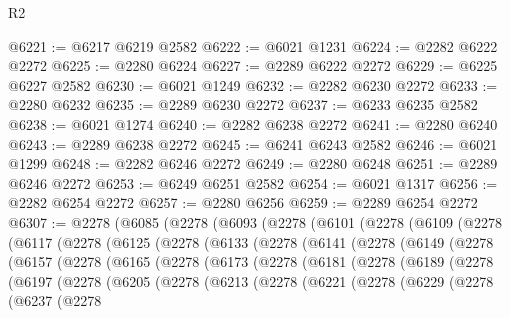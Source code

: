 \begin{lexlean}{R2}
\begin{coremodule}
@6221 := @6217 @6219 @2582
@6222 := @6021 @1231
@6224 := @2282 @6222 @2272
@6225 := @2280 @6224
@6227 := @2289 @6222 @2272
@6229 := @6225 @6227 @2582
@6230 := @6021 @1249
@6232 := @2282 @6230 @2272
@6233 := @2280 @6232
@6235 := @2289 @6230 @2272
@6237 := @6233 @6235 @2582
@6238 := @6021 @1274
@6240 := @2282 @6238 @2272
@6241 := @2280 @6240
@6243 := @2289 @6238 @2272
@6245 := @6241 @6243 @2582
@6246 := @6021 @1299
@6248 := @2282 @6246 @2272
@6249 := @2280 @6248
@6251 := @2289 @6246 @2272
@6253 := @6249 @6251 @2582
@6254 := @6021 @1317
@6256 := @2282 @6254 @2272
@6257 := @2280 @6256
@6259 := @2289 @6254 @2272
@6307 := @2278
    (@6085
      (@2278
        (@6093
          (@2278
            (@6101
              (@2278
                (@6109
                  (@2278
                    (@6117
                      (@2278
                        (@6125
                          (@2278
                            (@6133
                              (@2278
                                (@6141
                                  (@2278
                                    (@6149
                                      (@2278
                                        (@6157
                                          (@2278
                                            (@6165
                                              (@2278
                                                (@6173
                                                  (@2278
                                                    (@6181
                                                      (@2278
                                                        (@6189
                                                          (@2278
                                                            (@6197
                                                              (@2278
                                                                (@6205
                                                                  (@2278
                                                                    (@6213
                                                                      (@2278
                                                                        (@6221
                                                                          (@2278
                                                                            (@6229
                                                                              (@2278
                                                                                (@6237
                                                                                  (@2278

\end{coremodule}
\end{lexlean}

